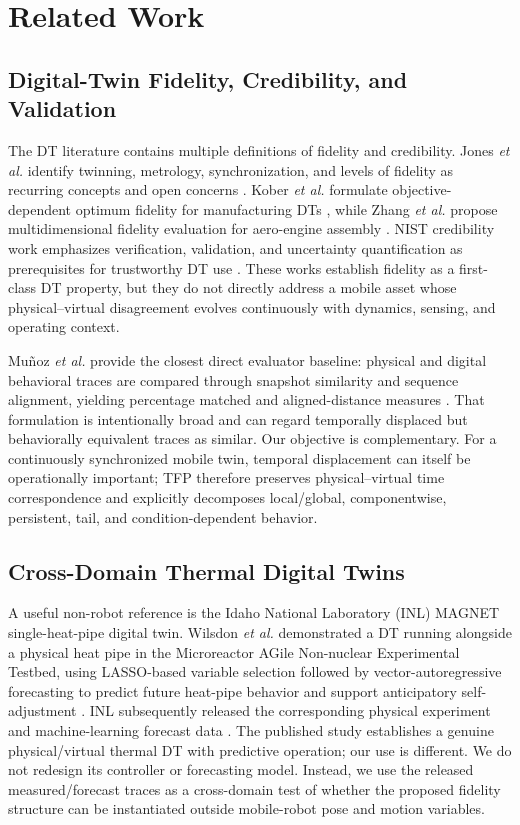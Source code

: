 \documentclass[journal]{IEEEtran}
\begin{document}
\section{Related Work}
\subsection{Digital-Twin Fidelity, Credibility, and Validation}
The DT literature contains multiple definitions of fidelity and credibility. Jones \emph{et al.} identify twinning, metrology, synchronization, and levels of fidelity as recurring concepts and open concerns \cite{jones2020}. Kober \emph{et al.} formulate objective-dependent optimum fidelity for manufacturing DTs \cite{kober2023}, while Zhang \emph{et al.} propose multidimensional fidelity evaluation for aero-engine assembly \cite{zhang2025}. NIST credibility work emphasizes verification, validation, and uncertainty quantification as prerequisites for trustworthy DT use \cite{shao2023,nist8620}. These works establish fidelity as a first-class DT property, but they do not directly address a mobile asset whose physical--virtual disagreement evolves continuously with dynamics, sensing, and operating context.

Mu\~noz \emph{et al.} provide the closest direct evaluator baseline: physical and digital behavioral traces are compared through snapshot similarity and sequence alignment, yielding percentage matched and aligned-distance measures \cite{munoz2024}. That formulation is intentionally broad and can regard temporally displaced but behaviorally equivalent traces as similar. Our objective is complementary. For a continuously synchronized mobile twin, temporal displacement can itself be operationally important; TFP therefore preserves physical--virtual time correspondence and explicitly decomposes local/global, componentwise, persistent, tail, and condition-dependent behavior.


\subsection{Cross-Domain Thermal Digital Twins}
A useful non-robot reference is the Idaho National Laboratory (INL) MAGNET single-heat-pipe digital twin. Wilsdon \emph{et al.} demonstrated a DT running alongside a physical heat pipe in the Microreactor AGile Non-nuclear Experimental Testbed, using LASSO-based variable selection followed by vector-autoregressive forecasting to predict future heat-pipe behavior and support anticipatory self-adjustment \cite{wilsdon2023magnet}. INL subsequently released the corresponding physical experiment and machine-learning forecast data \cite{inlmagnetdata}. The published study establishes a genuine physical/virtual thermal DT with predictive operation; our use is different. We do not redesign its controller or forecasting model. Instead, we use the released measured/forecast traces as a cross-domain test of whether the proposed fidelity structure can be instantiated outside mobile-robot pose and motion variables.
\end{document}
